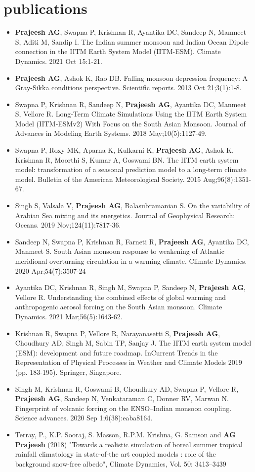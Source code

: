 \documentclass[]{cv-style}          %
\begin{document}
\section{publications}
\begin{itemize}
    \item \textbf{Prajeesh AG}, Swapna P, Krishnan R, Ayantika DC, Sandeep N, Manmeet S, Aditi M, Sandip I. The Indian summer monsoon and Indian Ocean Dipole connection in the IITM Earth System Model (IITM-ESM). Climate Dynamics. 2021 Oct 15:1-21.
    \item \textbf{Prajeesh AG}, Ashok K, Rao DB. Falling monsoon depression frequency: A Gray-Sikka conditions perspective. Scientific reports. 2013 Oct 21;3(1):1-8.
    \item Swapna P, Krishnan R, Sandeep N, \textbf{Prajeesh AG}, Ayantika DC, Manmeet S, Vellore R. Long‐Term Climate Simulations Using the IITM Earth System Model (IITM‐ESMv2) With Focus on the South Asian Monsoon. Journal of Advances in Modeling Earth Systems. 2018 May;10(5):1127-49.
    \item Swapna P, Roxy MK, Aparna K, Kulkarni K, \textbf{Prajeesh AG}, Ashok K, Krishnan R, Moorthi S, Kumar A, Goswami BN. The IITM earth system model: transformation of a seasonal prediction model to a long-term climate model. Bulletin of the American Meteorological Society. 2015 Aug;96(8):1351-67.
    \item Singh S, Valsala V, \textbf{Prajeesh AG}, Balasubramanian S. On the variability of Arabian Sea mixing and its energetics. Journal of Geophysical Research: Oceans. 2019 Nov;124(11):7817-36.
    \item Sandeep N, Swapna P, Krishnan R, Farneti R, \textbf{Prajeesh AG}, Ayantika DC, Manmeet S. South Asian monsoon response to weakening of Atlantic meridional overturning circulation in a warming climate. Climate Dynamics. 2020 Apr;54(7):3507-24
    \item Ayantika DC, Krishnan R, Singh M, Swapna P, Sandeep N, \textbf{Prajeesh AG}, Vellore R. Understanding the combined effects of global warming and anthropogenic aerosol forcing on the South Asian monsoon. Climate Dynamics. 2021 Mar;56(5):1643-62.
    \item Krishnan R, Swapna P, Vellore R, Narayanasetti S, \textbf{Prajeesh AG}, Choudhury AD, Singh M, Sabin TP, Sanjay J. The IITM earth system model (ESM): development and future roadmap. InCurrent Trends in the Representation of Physical Processes in Weather and Climate Models 2019 (pp. 183-195). Springer, Singapore.
    \item Singh M, Krishnan R, Goswami B, Choudhury AD, Swapna P, Vellore R, \textbf{Prajeesh AG}, Sandeep N, Venkataraman C, Donner RV, Marwan N. Fingerprint of volcanic forcing on the ENSO–Indian monsoon coupling. Science advances. 2020 Sep 1;6(38):eaba8164.
    \item Terray, P., K.P. Sooraj, S. Masson, R.P.M. Krishna, G. Samson and \textbf{AG Prajeesh} (2018) "Towards a realistic simulation of boreal summer tropical rainfall climatology in state-of-the art coupled models : role of the background snow-free albedo", Climate Dynamics, Vol. 50: 3413–3439
\end{itemize}
\end{document}
